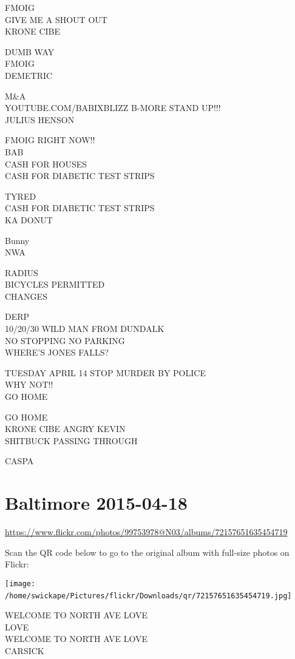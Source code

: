 \documentclass[10pt,letterpaper]{article}
\begin{document}
FMOIG\\
GIVE ME A SHOUT OUT\\
KRONE CIBE

DUMB WAY\\
FMOIG\\
DEMETRIC

M\&A\\
YOUTUBE.COM/BABIXBLIZZ B{-}MORE STAND UP!!!\\
JULIUS HENSON

FMOIG RIGHT NOW!!\\
BAB\\
CASH FOR HOUSES\\
CASH FOR DIABETIC TEST STRIPS

TYRED\\
CASH FOR DIABETIC TEST STRIPS\\
KA DONUT

Bunny\\
NWA

RADIUS\\
BICYCLES PERMITTED\\
CHANGES

DERP\\
10/20/30 WILD MAN FROM DUNDALK\\
NO STOPPING NO PARKING\\
WHERE'S JONES FALLS?

TUESDAY APRIL 14 STOP MURDER BY POLICE\\
WHY NOT!!\\
GO HOME

GO HOME\\
KRONE CIBE ANGRY KEVIN\\
SHITBUCK PASSING THROUGH

CASPA
\

\section*{Baltimore 2015-04-18}

\url{https://www.flickr.com/photos/99753978@N03/albums/72157651635454719}

Scan the QR code below to go to the original album with full-size photos on Flickr:

\texttt{[image: /home/swickape/Pictures/flickr/Downloads/qr/72157651635454719.jpg]}
\

WELCOME TO NORTH AVE LOVE\\
LOVE\\
WELCOME TO NORTH AVE LOVE\\
CARSICK
\end{document}

